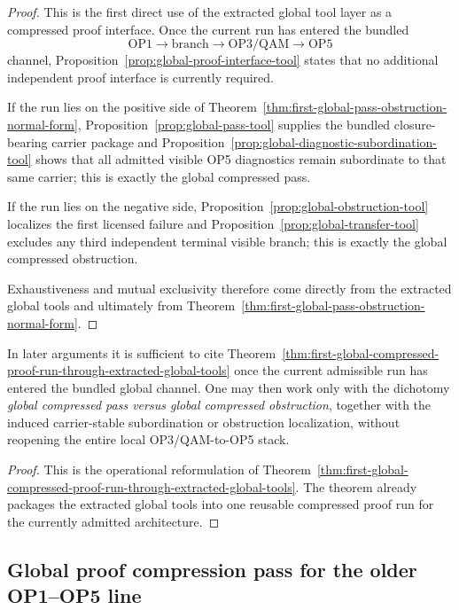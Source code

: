 \begin{proof}
This is the first direct use of the extracted global tool layer as a compressed proof interface. Once the current run has entered the bundled
\[
\text{OP1}\to\text{branch}\to\text{OP3/QAM}\to\text{OP5}
\]
channel, Proposition~\ref{prop:global-proof-interface-tool} states that no additional independent proof interface is currently required.

If the run lies on the positive side of Theorem~\ref{thm:first-global-pass-obstruction-normal-form}, Proposition~\ref{prop:global-pass-tool} supplies the bundled closure-bearing carrier package and Proposition~\ref{prop:global-diagnostic-subordination-tool} shows that all admitted visible OP5 diagnostics remain subordinate to that same carrier; this is exactly the global compressed pass.

If the run lies on the negative side, Proposition~\ref{prop:global-obstruction-tool} localizes the first licensed failure and Proposition~\ref{prop:global-transfer-tool} excludes any third independent terminal visible branch; this is exactly the global compressed obstruction.

Exhaustiveness and mutual exclusivity therefore come directly from the extracted global tools and ultimately from Theorem~\ref{thm:first-global-pass-obstruction-normal-form}.
\end{proof}

\begin{corollary}
\label{cor:first-operational-use-of-the-extracted-global-tools}
In later arguments it is sufficient to cite Theorem~\ref{thm:first-global-compressed-proof-run-through-extracted-global-tools} once the current admissible run has entered the bundled global channel. One may then work only with the dichotomy \emph{global compressed pass versus global compressed obstruction}, together with the induced carrier-stable subordination or obstruction localization, without reopening the entire local OP3/QAM-to-OP5 stack.
\end{corollary}

\begin{proof}
This is the operational reformulation of Theorem~\ref{thm:first-global-compressed-proof-run-through-extracted-global-tools}. The theorem already packages the extracted global tools into one reusable compressed proof run for the currently admitted architecture.
\end{proof}


\subsection{Global proof compression pass for the older OP1--OP5 line}
\label{sec:global-proof-compression-pass-for-the-older-op1-op5-line}

